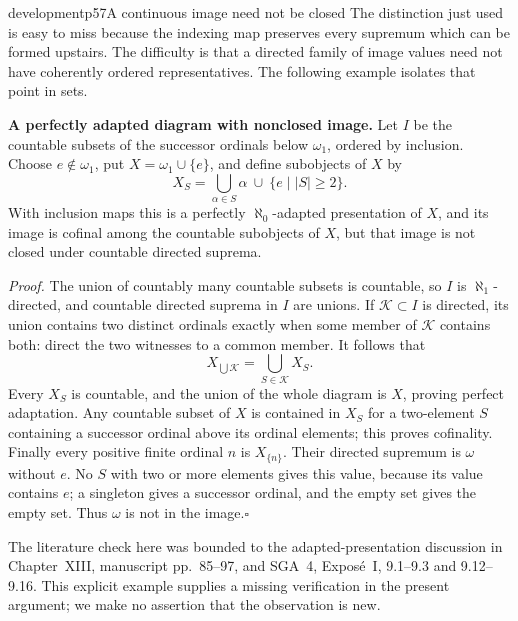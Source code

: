 \begin{dcomment}{development}{p57}{A continuous image need not be closed}
The distinction just used is easy to miss because the indexing map preserves every supremum which can be formed upstairs. The difficulty is that a directed family of image values need not have coherently ordered representatives. The following example isolates that point in sets.

\textbf{A perfectly adapted diagram with nonclosed image.}\ours
Let $I$ be the countable subsets of the successor ordinals below $\omega_1$, ordered by inclusion. Choose $e\notin\omega_1$, put $X=\omega_1\cup\{e\}$, and define subobjects of $X$ by
\[
 X_S=\bigcup_{\alpha\in S}\alpha
       \ \cup\ \{e\mid |S|\geq2\}.
\]
With inclusion maps this is a perfectly $\aleph_0$-adapted presentation of $X$, and its image is cofinal among the countable subobjects of $X$, but that image is not closed under countable directed suprema.

\emph{Proof.} The union of countably many countable subsets is countable, so $I$ is $\aleph_1$-directed, and countable directed suprema in $I$ are unions. If $\mathcal K\subset I$ is directed, its union contains two distinct ordinals exactly when some member of $\mathcal K$ contains both: direct the two witnesses to a common member. It follows that
\[
 X_{\bigcup\mathcal K}=\bigcup_{S\in\mathcal K}X_S.
\]
Every $X_S$ is countable, and the union of the whole diagram is $X$, proving perfect adaptation. Any countable subset of $X$ is contained in $X_S$ for a two-element $S$ containing a successor ordinal above its ordinal elements; this proves cofinality. Finally every positive finite ordinal $n$ is $X_{\{n\}}$. Their directed supremum is $\omega$ without $e$. No $S$ with two or more elements gives this value, because its value contains $e$; a singleton gives a successor ordinal, and the empty set gives the empty set. Thus $\omega$ is not in the image.\hfill$\square$

The literature check here was bounded to the adapted-presentation discussion in Chapter~XIII, manuscript pp.~85--97, and SGA~4, Expos\'e~I, 9.1--9.3 and 9.12--9.16. This explicit example supplies a missing verification in the present argument; we make no assertion that the observation is new.
\end{dcomment}

